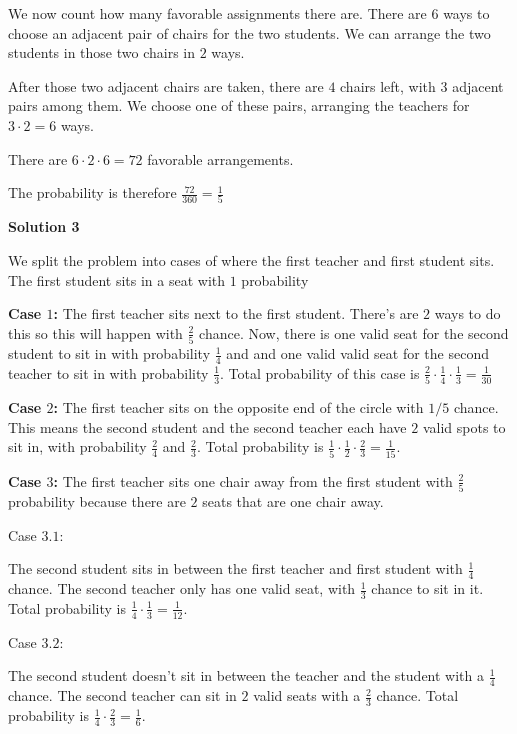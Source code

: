 \begin{enumerate}
 We now count how many favorable assignments there are. There are $6$ ways to choose an adjacent pair of chairs for the two students. We can arrange the two students in those two chairs in $2$ ways.

 After those two adjacent chairs are taken, there are $4$ chairs left, with $3$ adjacent pairs among them. We choose one of these pairs, arranging the teachers for $3 \cdot 2 = 6$ ways.

 There are $6\cdot 2 \cdot 6 = 72$ favorable arrangements.

 The probability is therefore $\frac{72}{360} = \boxed{\frac{1}{5}}$




\textbf{Solution 3}

We split the problem into cases of where the first teacher and first student sits. The first student sits in a seat with $1$ probability

 


 \textbf{Case $1$:} The first teacher sits next to the first student. There's are $2$ ways to do this so this will happen with $\frac{2}{5}$ chance. Now, there is one valid seat for the second student to sit in with probability $\frac{1}{4}$ and and one valid valid seat for the second teacher to sit in with probability $\frac{1}{3}$. Total probability of this case is $\frac{2}{5}\cdot \frac{1}{4}\cdot \frac{1}{3} = \frac{1}{30}$

 


 \textbf{Case $2$:} The first teacher sits on the opposite end of the circle with $1/5$ chance. This means the second student and the second teacher each have $2$ valid spots to sit in, with probability $\frac{2}{4}$ and $\frac{2}{3}$. Total probability is $\frac{1}{5}\cdot \frac{1}{2}\cdot \frac{2}{3} = \frac{1}{15}$.

 


 \textbf{Case $3$:} The first teacher sits one chair away from the first student with $\frac{2}{5}$ probability because there are $2$ seats that are one chair away. 

 Case $3.1$:

 The second student sits in between the first teacher and first student with $\frac{1}{4}$ chance. The second teacher only has one valid seat, with $\frac{1}{3}$ chance to sit in it. Total probability is $\frac{1}{4}\cdot \frac{1}{3} = \frac{1}{12}$.

 Case $3.2$:

 The second student doesn't sit in between the teacher and the student with a $\frac{1}{4}$ chance. The second teacher can sit in $2$ valid seats with a $\frac{2}{3}$ chance. Total probability is $\frac{1}{4}\cdot \frac{2}{3} = \frac{1}{6}$.


\end{enumerate}
